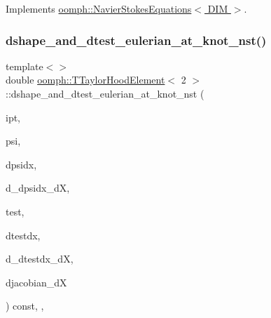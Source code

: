 Implements \hyperlink{classoomph_1_1NavierStokesEquations_afbc63afd804f5143c74b0ca1be76ef82}{oomph\+::\+Navier\+Stokes\+Equations$<$ D\+I\+M $>$}.

\mbox{\label{classoomph_1_1TTaylorHoodElement_aa7eedbdb84e6b53605be1ee04dcbb076}} 
\subsubsection{\texorpdfstring{dshape\+\_\+and\+\_\+dtest\+\_\+eulerian\+\_\+at\+\_\+knot\+\_\+nst()}{dshape\_and\_dtest\_eulerian\_at\_knot\_nst()}\hspace{0.1cm}{\footnotesize\ttfamily [3/4]}}
{\footnotesize\ttfamily template$<$$>$ \\
double \hyperlink{classoomph_1_1TTaylorHoodElement}{oomph\+::\+T\+Taylor\+Hood\+Element}$<$ 2 $>$\+::dshape\+\_\+and\+\_\+dtest\+\_\+eulerian\+\_\+at\+\_\+knot\+\_\+nst (\begin{DoxyParamCaption}\item[{const unsigned \&}]{ipt,  }\item[{\hyperlink{classoomph_1_1Shape}{Shape} \&}]{psi,  }\item[{\hyperlink{classoomph_1_1DShape}{D\+Shape} \&}]{dpsidx,  }\item[{\hyperlink{classoomph_1_1RankFourTensor}{Rank\+Four\+Tensor}$<$ double $>$ \&}]{d\+\_\+dpsidx\+\_\+dX,  }\item[{\hyperlink{classoomph_1_1Shape}{Shape} \&}]{test,  }\item[{\hyperlink{classoomph_1_1DShape}{D\+Shape} \&}]{dtestdx,  }\item[{\hyperlink{classoomph_1_1RankFourTensor}{Rank\+Four\+Tensor}$<$ double $>$ \&}]{d\+\_\+dtestdx\+\_\+dX,  }\item[{\hyperlink{classoomph_1_1DenseMatrix}{Dense\+Matrix}$<$ double $>$ \&}]{djacobian\+\_\+dX }\end{DoxyParamCaption}) const\hspace{0.3cm}{\ttfamily [inline]}, {\ttfamily [protected]}, {\ttfamily [virtual]}}

